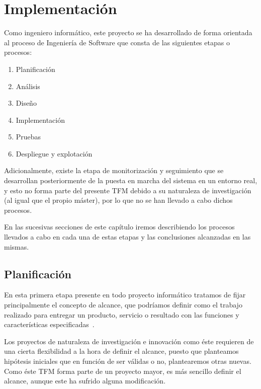 \graphicspath{{capitulos/Capitulo4-Implementacion/recursos/}}

\section{Implementación} \label{capitulo:4}

Como ingeniero informático, este proyecto se ha desarrollado de forma orientada al proceso de Ingeniería de Software que consta de las siguientes etapas o procesos: 
\begin{enumerate}
	\item Planificación
	\item Análisis
	\item Diseño
	\item Implementación%
	\item Pruebas
	\item Despliegue y explotación    
\end{enumerate}
Adicionalmente, existe la etapa de monitorización y seguimiento que se desarrollan posteriormente de la puesta en marcha del sistema en un entorno real, y esto no forma parte del presente TFM debido a su naturaleza de investigación (al igual que el propio máster), por lo que no se han llevado a cabo dichos procesos.

En las sucesivas secciones de este capítulo iremos describiendo los procesos llevados a cabo en cada una de estas etapas y las conclusiones alcanzadas en las mismas.

\subsection{Planificación}
\label{sec:4:planificacion}
En esta primera etapa presente en todo proyecto informático tratamos de fijar principalmente el concepto de alcance, que podríamos definir como el trabajo realizado para entregar un producto, servicio o resultado con
las funciones y características especificadas~\cite{PMBOK}.

Los proyectos de naturaleza de investigación e innovación como éste requieren de una cierta flexibilidad a la hora de definir el alcance, puesto que planteamos hipótesis iniciales que en función de ser válidas o no, plantearemos otras nuevas. Como éste TFM forma parte de un proyecto mayor, es más sencillo definir el alcance, aunque este ha sufrido alguna modificación.

